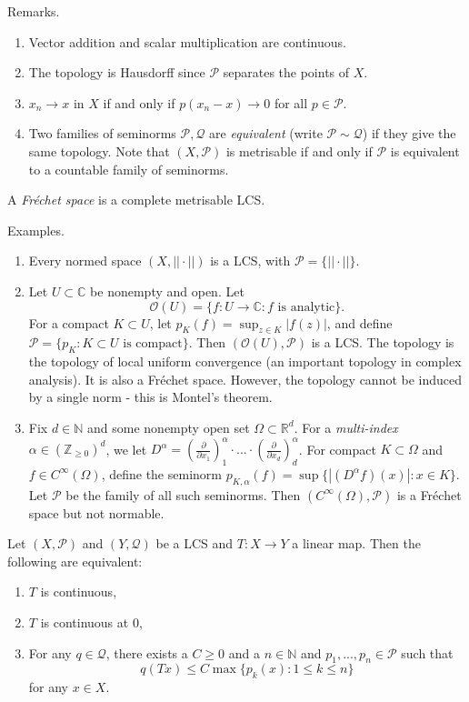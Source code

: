 Remarks.
\begin{enumerate}
  \item Vector addition and scalar multiplication are continuous.
  \item The topology is Hausdorff since $\mathcal{P}$ separates the points of $X$.
  \item $x_n\to x$ in $X$ if and only if $p(x_n-x)\to 0$ for all $p\in\mathcal{P}$.
  \item Two families of seminorms $\mathcal{P},\mathcal{Q}$ are \emph{equivalent}
  (write $\mathcal{P}\sim\mathcal{Q}$) if they give the same topology.
  Note that $(X,\mathcal{P})$ is metrisable if and only if $\mathcal{P}$
  is equivalent to a countable family of seminorms.
\end{enumerate}

A \emph{Fr\'echet space} is a complete metrisable LCS.

Examples.

\begin{enumerate}
  \item Every normed space $(X,||\cdot ||)$ is a LCS, with $\mathcal{P}=\{||\cdot ||\}$.
  \item Let $U\subset \mathbb{C}$ be nonempty and open.
  Let $$\mathcal{O}(U)=\{f:U\to\mathbb{C}:\text{$f$ is analytic}\}.$$
  For a compact $K\subset U$, let $p_K(f)=\sup_{z\in K}|f(z)|$,
  and define $\mathcal{P}=\{p_K:\text{$K\subset U$ is compact}\}$.
  Then $(\mathcal{O}(U),\mathcal{P})$ is a LCS. The topology is the topology of local
  uniform convergence (an important topology in complex analysis).
  It is also a Fr\'echet space.
  However, the topology cannot be induced by a single norm - this is Montel's theorem.
  \item Fix $d\in\mathbb{N}$ and some nonempty open set $\Omega\subset\mathbb{R}^d$.
  For a \emph{multi-index} $\alpha\in(\mathbb{Z}_{\geq 0})^d$, we let
  $D^\alpha=(\frac{\partial}{\partial x_1})^\alpha_1\cdot ...\cdot (\frac{\partial}{\partial x_d})^\alpha_d$.
  For compact $K\subset\Omega$ and $f\in C^\infty(\Omega)$, define
  the seminorm
  $p_{K,\alpha}(f)=\sup\{|(D^\alpha f)(x)|:x\in K\}$.
  Let $\mathcal{P}$ be the family of all such seminorms.
  Then $(C^\infty(\Omega),\mathcal{P})$ is a Fr\'echet space but not normable.
\end{enumerate}

\begin{lemma}
  Let $(X,\mathcal{P})$ and $(Y,\mathcal{Q})$ be a LCS and $T:X\to Y$ a linear map.
  Then the following are equivalent:
  \begin{enumerate}
    \item $T$ is continuous,
    \item $T$ is continuous at $0$,
    \item For any $q\in\mathcal{Q}$, there exists a $C\geq 0$ and a $n\in\mathbb{N}$
    and $p_1,...,p_n\in\mathcal{P}$ such that
    $$q(Tx)\leq C\max\{p_k(x):1\leq k\leq n\}$$
    for any $x\in X$.
  \end{enumerate}
\end{lemma}

